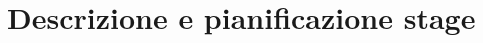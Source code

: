 \chapter{Descrizione e pianificazione stage}\label{chap:Descrizione e pianificazione stage}



\newpage